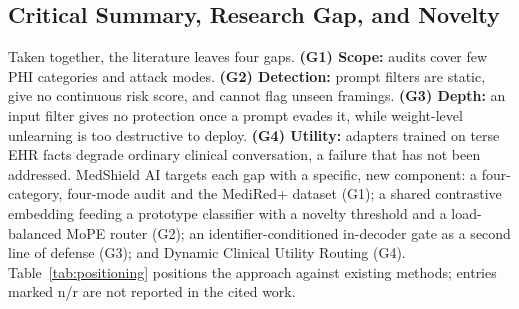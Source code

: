 \documentclass[lettersize,journal]{IEEEtran}
\begin{document}
\subsection{Critical Summary, Research Gap, and Novelty}
\label{sec:gap}
Taken together, the literature leaves four gaps. \textbf{(G1) Scope:} audits cover few PHI categories and attack modes. \textbf{(G2) Detection:} prompt filters are static, give no continuous risk score, and cannot flag unseen framings. \textbf{(G3) Depth:} an input filter gives no protection once a prompt evades it, while weight-level unlearning is too destructive to deploy. \textbf{(G4) Utility:} adapters trained on terse EHR facts degrade ordinary clinical conversation, a failure that has not been addressed. MedShield AI targets each gap with a specific, new component: a four-category, four-mode audit and the MediRed+ dataset (G1); a shared contrastive embedding feeding a prototype classifier with a novelty threshold and a load-balanced MoPE router (G2); an identifier-conditioned in-decoder gate as a second line of defense (G3); and Dynamic Clinical Utility Routing (G4). Table~\ref{tab:positioning} positions the approach against existing methods; entries marked n/r are not reported in the cited work.

\begin{table}[!t]
\caption{Positioning of MedShield AI Against Existing Approaches (Yes/No; n/r = not reported in the cited work, N/A = not applicable)\label{tab:positioning}}
\centering
\small
{}
\end{table}
\end{document}

